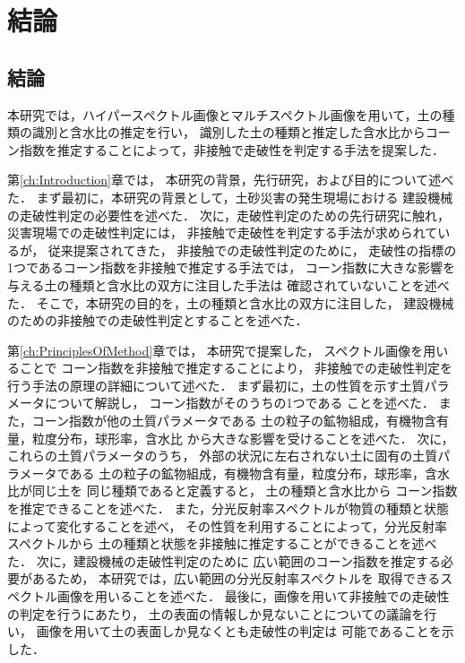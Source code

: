 \chapter{結論}
\thispagestyle{empty}
\label{ch:Conclusion}
\minitoc

\newpage
\section{結論}

本研究では，ハイパースペクトル画像とマルチスペクトル画像を用いて，土の種類の識別と含水比の推定を行い，
識別した土の種類と推定した含水比からコーン指数を推定することによって，非接触で走破性を判定する手法を提案した．

第\ref{ch:Introduction}章では，
本研究の背景，先行研究，および目的について述べた．
%
まず最初に，本研究の背景として，土砂災害の発生現場における
建設機械の走破性判定の必要性を述べた．
%
次に，走破性判定のための先行研究に触れ，
災害現場での走破性判定には，
非接触で走破性を判定する手法が求められているが，
従来提案されてきた，
非接触での走破性判定のために，
走破性の指標の1つであるコーン指数を非接触で推定する手法では，
コーン指数に大きな影響を与える土の種類と含水比の双方に注目した手法は
確認されていないことを述べた．
%
そこで，本研究の目的を，土の種類と含水比の双方に注目した，
建設機械のための非接触での走破性判定とすることを述べた．


第\ref{ch:PrinciplesOfMethod}章では，
本研究で提案した，
スペクトル画像を用いることで
コーン指数を非接触で推定することにより，
非接触での走破性判定を行う手法の原理の詳細について述べた．
%
まず最初に，土の性質を示す土質パラメータについて解説し，
コーン指数がそのうちの1つである
ことを述べた．
また，コーン指数が他の土質パラメータである
土の粒子の鉱物組成，有機物含有量，粒度分布，球形率，含水比
から大きな影響を受けることを述べた．
% 
次に，これらの土質パラメータのうち，
外部の状況に左右されない土に固有の土質パラメータである
土の粒子の鉱物組成，有機物含有量，粒度分布，球形率，含水比が同じ土を
同じ種類であると定義すると，
土の種類と含水比から
コーン指数を推定できることを述べた．
%
また，分光反射率スペクトルが物質の種類と状態によって変化することを述べ，
その性質を利用することによって，分光反射率スペクトルから
土の種類と状態を非接触に推定することができることを述べた．
%
次に，建設機械の走破性判定のために
広い範囲のコーン指数を推定する必要があるため，
本研究では，広い範囲の分光反射率スペクトルを
取得できるスペクトル画像を用いることを述べた．
%
最後に，画像を用いて非接触での走破性の判定を行うにあたり，
土の表面の情報しか見ないことについての議論を行い，
画像を用いて土の表面しか見なくとも走破性の判定は
可能であることを示した．

